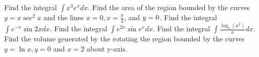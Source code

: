 \documentclass[
  course = {{MATH102 Calculus II}},
  quartile = {{2}},
  assignment = 10,%
  topic = {{7.1: Integration by Parts}},
  firstexercise = 1,
  term = 202
]{aga-homework}
\begin{document}
\fbox{
\begin{minipage}{\textwidth}



\[
\displaystyle
\int udv = uv - \int v du
\]

\[
\displaystyle
\int_a^b udv = \left. uv\right|_a^b - \int_a^b v du
\]
\end{minipage}
}

\newpage

\problem Find the integral $\displaystyle \int x^3e^x dx $.
\newpage
\problem Find the area of the region bounded by the curves $\displaystyle y=x\sec^2x $ and the lines $x=0, x=\frac{\pi}{4}$, and $y=0\nobreak$.
\newpage
\problem Find the integral $\displaystyle \int e^{-x}\sin 2x dx $.
\newpage
\problem Find the integral $\displaystyle \int e^{2x}\sin e^{x} dx $.
\newpage
\problem Find the integral $\displaystyle \int \frac{\log_3(x^2)}{x} dx $.
\newpage
\problem Find the volume generated by the rotating the region bounded by the curves $y=\ln x, y=0$ and $x=2$ about y-axis.

\afterpage{\null\newpage}

\afterpage{\null\newpage}

\afterpage{\null\newpage}
\end{document}
